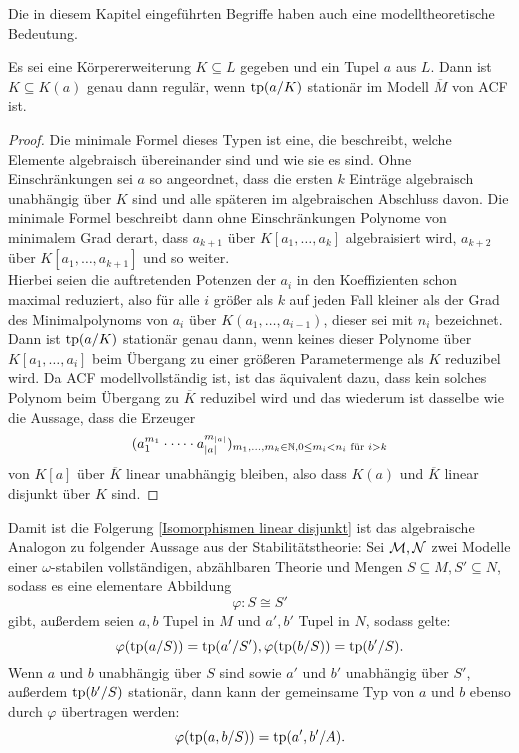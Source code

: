     Die in diesem Kapitel eingeführten Begriffe haben auch eine modelltheoretische Bedeutung.
    
    \begin{lemma}
    	Es sei eine Körpererweiterung $K\subseteq L$ gegeben und ein Tupel $a$ aus $L$. Dann ist $K\subseteq K(a)$ genau dann regulär, wenn $\operatorname{tp}(a/K)$ stationär im Modell $\overline{M}$ von ACF ist.
    \end{lemma}
    \begin{proof}
    	Die minimale Formel dieses Typen ist eine, die beschreibt, welche Elemente algebraisch übereinander sind und wie sie es sind. Ohne Einschränkungen sei $a$ so angeordnet, dass die ersten $k$ Einträge algebraisch unabhängig über $K$ sind und alle späteren im algebraischen Abschluss davon. Die minimale Formel beschreibt dann ohne Einschränkungen Polynome von minimalem Grad derart, dass $a_{k+1}$ über $K[a_1,\dots,a_k]$ algebraisiert wird, $a_{k+2}$ über $K[a_1,\dots,a_{k+1}]$ und so weiter.\\
    	Hierbei seien die auftretenden Potenzen der $a_i$ in den Koeffizienten schon maximal reduziert, also für alle $i$ größer als $k$ auf jeden Fall kleiner als der Grad des Minimalpolynoms von $a_i$ über $K(a_1,\dots,a_{i-1})$, dieser sei mit $n_i$ bezeichnet. Dann ist $\operatorname{tp}(a/K)$ stationär genau dann, wenn keines dieser Polynome über $K[a_1,\dots,a_i]$ beim Übergang zu einer größeren Parametermenge als $K$ reduzibel wird. Da ACF modellvollständig ist, ist das äquivalent dazu, dass kein solches Polynom beim Übergang zu $\overline{K}$ reduzibel wird und das wiederum ist dasselbe wie die Aussage, dass die Erzeuger $$(a_1^{m_1}\cdot\dots\cdot a_{\left| a \right|}^{m_{\left| a \right|}})_{m_1,\dots,m_k\in\mathbb{N},0\leq m_i<n_i\text{ für }i>k}$$ von $K[a]$ über $\overline{K}$ linear unabhängig bleiben, also dass $K(a)$ und $\overline{K}$ linear disjunkt über $K$ sind.
    \end{proof}
    
    \begin{remark}
    	Damit ist die Folgerung \ref{Isomorphismen linear disjunkt} ist das algebraische Analogon zu folgender Aussage aus der Stabilitätstheorie: Sei $\mathcal{M},\mathcal{N}$ zwei Modelle einer $\omega$-stabilen vollständigen, abzählbaren Theorie und Mengen $S\subseteq M,S'\subseteq N$, sodass es eine elementare Abbildung $$\varphi:S\cong S'$$ gibt, außerdem seien $a,b$ Tupel in $M$ und $a',b'$ Tupel in $N$, sodass gelte: $$\varphi(\operatorname{tp}(a/S))=\operatorname{tp}(a'/S'),\varphi(\operatorname{tp}(b/S))=\operatorname{tp}(b'/S).$$
    	Wenn $a$ und $b$ unabhängig über $S$ sind sowie $a'$ und $b'$ unabhängig über $S'$, außerdem $\operatorname{tp}(b'/S)$ stationär, dann kann der gemeinsame Typ von $a$ und $b$ ebenso durch $\varphi$ übertragen werden: $$\varphi(\operatorname{tp}(a,b/S))=\operatorname{tp}(a',b'/A).$$
    \end{remark}

